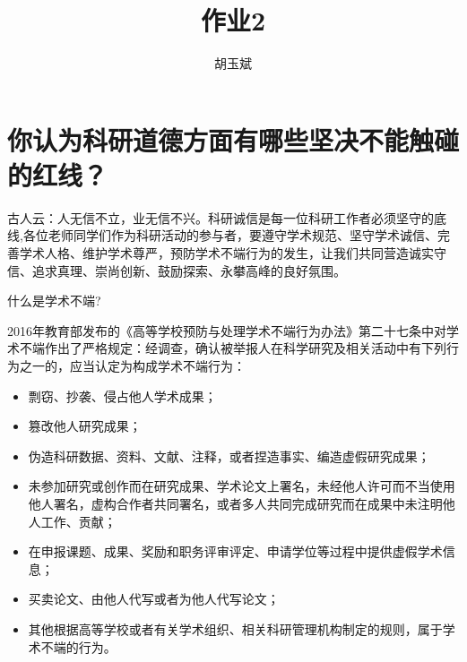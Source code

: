 \documentclass[onecolumn,oneside]{BUPTHomework}
\author{胡玉斌}
\title{作业2}
\begin{document}
  \maketitle

  \section*{你认为科研道德方面有哪些坚决不能触碰的红线？}

  古人云：人无信不立，业无信不兴。科研诚信是每一位科研工作者必须坚守的底线,各位老师同学们作为科研活动的参与者，要遵守学术规范、坚守学术诚信、完善学术人格、维护学术尊严，预防学术不端行为的发生，让我们共同营造诚实守信、追求真理、崇尚创新、鼓励探索、永攀高峰的良好氛围。

  什么是学术不端?

  2016年教育部发布的《高等学校预防与处理学术不端行为办法》第二十七条中对学术不端作出了严格规定：经调查，确认被举报人在科学研究及相关活动中有下列行为之一的，应当认定为构成学术不端行为：

  \begin{itemize}
    \item 剽窃、抄袭、侵占他人学术成果；
    \item 篡改他人研究成果；
    \item 伪造科研数据、资料、文献、注释，或者捏造事实、编造虚假研究成果；
    \item 未参加研究或创作而在研究成果、学术论文上署名，未经他人许可而不当使用他人署名，虚构合作者共同署名，或者多人共同完成研究而在成果中未注明他人工作、贡献；
    \item 在申报课题、成果、奖励和职务评审评定、申请学位等过程中提供虚假学术信息；
    \item 买卖论文、由他人代写或者为他人代写论文；
    \item 其他根据高等学校或者有关学术组织、相关科研管理机构制定的规则，属于学术不端的行为。
  \end{itemize}
\end{document}
